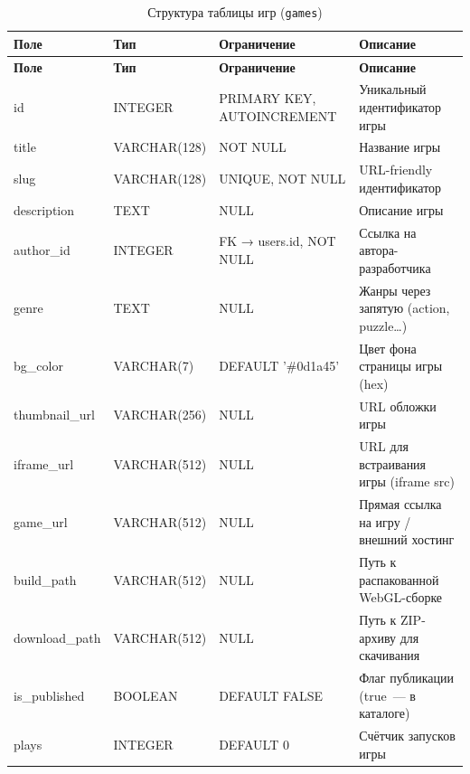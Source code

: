 \begin{longtable}{|l|l|p{3.5cm}|p{5.5cm}|}
    \caption{Структура таблицы игр (\texttt{games})}
    \label{tab:db_games} \\
    \hline
    \textbf{Поле} & \textbf{Тип} & \textbf{Ограничение} & \textbf{Описание} \\ \hline
    \endfirsthead
    \tabcont{\ref{tab:db_games}}
    \textbf{Поле} & \textbf{Тип} & \textbf{Ограничение} & \textbf{Описание} \\ \hline
    \endhead
    \hline
    \endfoot
    \hline
    \endlastfoot
    id               & INTEGER      & PRIMARY KEY, AUTOINCREMENT  & Уникальный идентификатор игры \\ \hline
    title            & VARCHAR(128) & NOT NULL                    & Название игры \\ \hline
    slug             & VARCHAR(128) & UNIQUE, NOT NULL            & URL-friendly идентификатор \\ \hline
    description      & TEXT         & NULL                        & Описание игры \\ \hline
    author\_id       & INTEGER      & FK → users.id, NOT NULL     & Ссылка на автора-разработчика \\ \hline
    genre            & TEXT         & NULL                        & Жанры через запятую (action, puzzle\ldots) \\ \hline
    bg\_color        & VARCHAR(7)   & DEFAULT '\#0d1a45'          & Цвет фона страницы игры (hex) \\ \hline
    thumbnail\_url   & VARCHAR(256) & NULL                        & URL обложки игры \\ \hline
    iframe\_url      & VARCHAR(512) & NULL                        & URL для встраивания игры (iframe src) \\ \hline
    game\_url        & VARCHAR(512) & NULL                        & Прямая ссылка на игру / внешний хостинг \\ \hline
    build\_path      & VARCHAR(512) & NULL                        & Путь к распакованной WebGL-сборке \\ \hline
    download\_path   & VARCHAR(512) & NULL                        & Путь к ZIP-архиву для скачивания \\ \hline
    is\_published    & BOOLEAN      & DEFAULT FALSE               & Флаг публикации (true~--- в каталоге) \\ \hline
    plays            & INTEGER      & DEFAULT 0                   & Счётчик запусков игры \\ \hline

\end{longtable}
